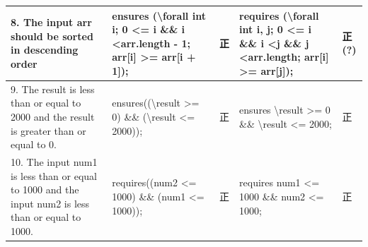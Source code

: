 \documentclass[uplatex, twocolumn, 10pt]{jsarticle} %
\begin{document}
\begin{table}[t]
\begin{tabular}{p{30mm}|p{45mm}|p{7mm}|p{45mm}|p{7mm}}
        8. The input arr should be sorted in descending order                                              & ensures (\textbackslash forall int i; 0 \textless= i \&\& i \textless arr.length - 1; arr[i] \textgreater= arr[i + 1]);                                                                                                                                                                                                                                                                                                                                                                                  & 正                                                               & requires (\textbackslash forall int i, j; 0 \textless= i \&\& i \textless j \&\& j \textless arr.length; arr[i] \textgreater= arr[j]); & 正(?) \\ \hline
        9. The result is less than or equal to 2000 and the result is greater than or equal to 0.          & ensures((\textbackslash result \textgreater= 0) \&\& (\textbackslash result \textless= 2000));                                                                                                                                                                                                                                                                                                                                                                                                           & 正                                                               & ensures \textbackslash result \textgreater= 0 \&\& \textbackslash result \textless= 2000;                                              & 正    \\ \hline
        10. The input num1 is less than or equal to 1000 and the input num2 is less than or equal to 1000. & requires((num2 \textless= 1000) \&\& (num1 \textless= 1000));                                                                                                                                                                                                                                                                                                                                                                                                                                            & 正                                                               & requires num1 \textless= 1000 \&\& num2 \textless= 1000;                                                                               & 正    \\ \hline
    \end{tabular}
\end{table}
\end{document}
